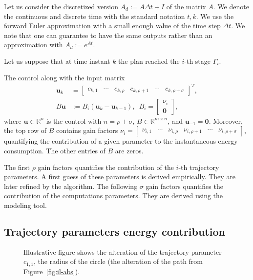 \documentclass[letterpaper,10pt,conference]{ieeeconf}
\newcommand{\figpath}{./figures}
\theoremstyle{definition}
\begin{document}
Let us consider the discretized version $A_d:=A\Delta t+I$ of the matrix $A$. We denote the continuous and discrete time with the standard notation $t,k$. We use the forward Euler approximation with a small enough value of the time step $\Delta t$. We note that one can guarantee to have the same outputs rather than an approximation with $A_d:=e^{At}$.

Let us suppose that at time instant $k$ the plan reached the $i$-th stage $\Gamma_i$.

The control along with the input matrix
\begin{equation}\label{eq:state-control}\begin{split}
  \mathbf{u}_k&=\begin{bmatrix}c_{k,1} & \cdots & c_{k,\rho} & c_{k,\rho+1} & \cdots & c_{k,\rho+\sigma}\end{bmatrix}^T,\\
  B\mathbf{u}&:=B_i(\mathbf{u}_k-\mathbf{u}_{k-1}),\,\,\,B_i=\left[\begin{array}{c} \nu_i\\\mathbf{0}\end{array}\right],
\end{split}\end{equation}
where $\mathbf{u}\in\mathbb{R}^n$ is the control with $n=\rho+\sigma$, $B\in\mathbb{R}^{m\times n}$, and $\mathbf{u}_{-1}=\mathbf{0}$. Moreover, the top row of $B$ contains gain factors $\nu_i=\begin{bmatrix}\nu_{i,1} & \cdots & \nu_{i,\rho} & \nu_{i,\rho + 1}& \cdots & \nu_{i,\rho+\sigma}\end{bmatrix}$, quantifying the contribution of a given parameter to the instantaneous energy consumption. The other entries of $B$ are zeros. 

The first $\rho$ gain factors quantifies the contribution of the $i$-th trajectory parameters. A first guess of these parameters is derived empirically. They are later refined by the algorithm. The following $\sigma$ gain factors quantifies the contribution of the computations parameters. They are derived using the modeling tool. 

\subsection{Trajectory parameters energy contribution}
\label{sec:model}

\begin{figure}[h]
  \centering
  
  \caption{Illustrative figure shows the alteration of the trajectory parameter $c_{1,1}$, the radius of the circle (the alteration of the path from Figure~\ref{fig:il-abs}).}
  \label{fig:tee1}
\end{figure}
\end{document}
